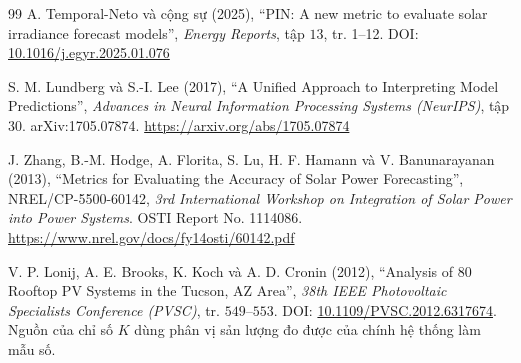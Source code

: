 \documentclass[12pt,a4paper]{article}
\begin{document}
\begin{thebibliography}{99}
A. Temporal-Neto và cộng sự (2025),
``PIN: A new metric to evaluate solar irradiance forecast models'',
\textit{Energy Reports}, tập $13$, tr. 1--12.
DOI: \href{https://doi.org/10.1016/j.egyr.2025.01.076}{10.1016/j.egyr.2025.01.076}

S. M. Lundberg và S.-I. Lee (2017),
``A Unified Approach to Interpreting Model Predictions'',
\textit{Advances in Neural Information Processing Systems (NeurIPS)}, tập 30.
arXiv:1705.07874. \url{https://arxiv.org/abs/1705.07874}

J. Zhang, B.-M. Hodge, A. Florita, S. Lu, H. F. Hamann và V. Banunarayanan (2013),
``Metrics for Evaluating the Accuracy of Solar Power Forecasting'',
NREL/CP-5500-60142, \textit{3rd International Workshop on Integration of Solar Power into
Power Systems}. OSTI Report No. 1114086.
\url{https://www.nrel.gov/docs/fy14osti/60142.pdf}

V. P. Lonij, A. E. Brooks, K. Koch và A. D. Cronin (2012),
``Analysis of 80 Rooftop PV Systems in the Tucson, AZ Area'',
\textit{38th IEEE Photovoltaic Specialists Conference (PVSC)}, tr. $549$--$553$.
DOI: \href{https://doi.org/10.1109/PVSC.2012.6317674}{10.1109/PVSC.2012.6317674}.
Nguồn của chỉ số $K$ dùng phân vị sản lượng đo được của chính hệ thống làm mẫu số.

\end{thebibliography}
\end{document}
